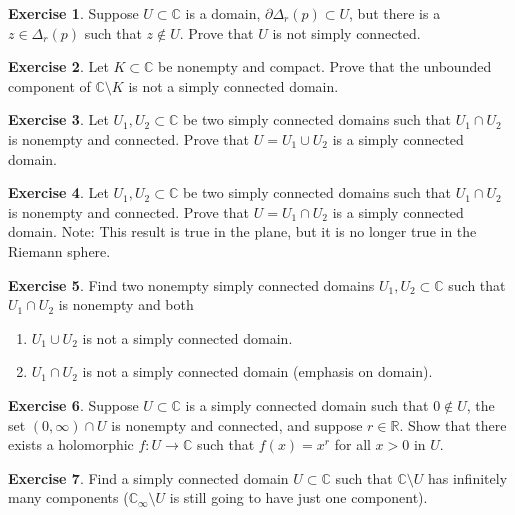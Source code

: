 \documentclass[12pt,openany]{book}
\newcommand{\C}{{\mathbb{C}}}
\newcommand{\R}{{\mathbb{R}}}
\theoremstyle{plain}
\theoremstyle{remark}
\theoremstyle{definition}
\newenvironment{exbox}{%
    \def\FrameCommand{\vrule width 1pt \relax\hspace{10pt}}%
    \MakeFramed{\advance\hsize-\width\FrameRestore}%
}{%
    \endMakeFramed
}
\newenvironment{exnumparts}{%
    \leavevmode\begin{enumerate}[1),noitemsep,topsep=0pt,parsep=0pt,partopsep=0pt]
}{%
    \end{enumerate}
}
\theoremstyle{exercise}
\newtheorem{exercise}{Exercise}[section]
\theoremstyle{example}
\begin{document}
\begin{exbox}
\begin{exercise}
Suppose $U \subset \C$ is a domain, $\partial \Delta_r(p) \subset U$,
but there is a $z \in \Delta_r(p)$ such that $z \notin U$.
Prove that $U$ is not simply connected.
\end{exercise}

\begin{exercise}
Let $K \subset \C$ be nonempty and compact.
Prove that the unbounded component of $\C \setminus K$ is not a
simply connected domain.
\end{exercise}

\begin{exercise}
Let $U_1,U_2 \subset \C$ be two simply connected domains such that $U_1 \cap
U_2$ is nonempty and connected.
Prove that $U = U_1 \cup U_2$ is a simply connected domain.
\end{exercise}

\begin{exercise}
Let $U_1,U_2 \subset \C$ be two simply connected domains such that $U_1 \cap
U_2$ is nonempty and connected.
Prove that $U = U_1 \cap U_2$ is a simply connected domain.
Note: This result is true in the plane, but it is no longer true in the Riemann
sphere.
\end{exercise}

\begin{exercise}
Find two nonempty simply connected domains
$U_1,U_2 \subset \C$ such that $U_1 \cap U_2$ is nonempty and both
\begin{exnumparts}
\item
$U_1 \cup U_2$ is not a simply connected domain.
\item
$U_1 \cap U_2$ is not a simply connected domain (emphasis on domain).
\end{exnumparts}
\end{exercise}

\begin{exercise}
Suppose $U \subset \C$ is a simply connected domain such that $0 \notin U$,
the set $(0,\infty) \cap U$ is nonempty and connected, and suppose $r \in \R$.
Show that there exists a holomorphic $f \colon U \to \C$ such
that $f(x) = x^r$ for all $x > 0$ in $U$.
\end{exercise}

\begin{exercise}
Find a simply connected domain $U \subset \C$ such that $\C \setminus U$
has infinitely many components ($\C_\infty \setminus U$ is still going to
have just one component).
\end{exercise}
\end{exbox}
\end{document}
